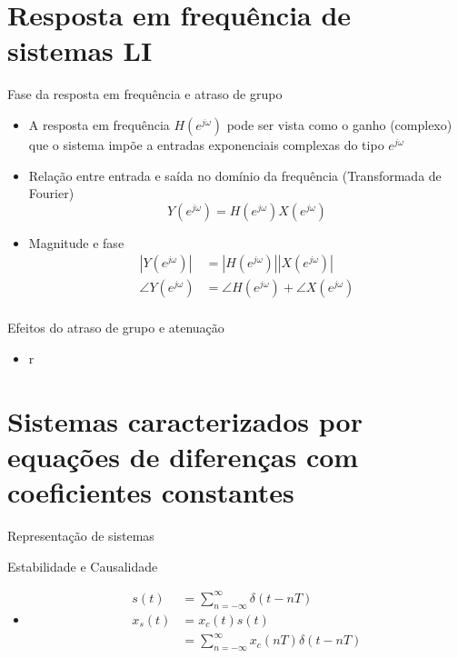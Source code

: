 \section{Resposta em frequência de sistemas LI}
\begin{slide}{Fase da resposta em frequência e atraso de grupo}
\begin{itemize}
	\item A resposta em frequência $H(e^{j\omega})$ pode ser vista como o ganho (complexo) que o sistema impõe a entradas exponenciais complexas do tipo $e^{j\omega}$
	\item Relação entre entrada e saída no domínio da frequência (Transformada de Fourier)
	   \begin{equation*}
		   Y(e^{j\omega}) = H(e^{j\omega})X(e^{j\omega})
	   \end{equation*}
        \item Magnitude e fase
	   \begin{align*}
		   |Y(e^{j\omega})| &= |H(e^{j\omega})| |X(e^{j\omega})|\\
		   \angle Y(e^{j\omega}) &= \angle H(e^{j\omega}) + \angle X(e^{j\omega})\\
	   \end{align*}
\end{itemize}
\end{slide}

\begin{slide}{Efeitos do atraso de grupo e atenuação}
\begin{itemize}
	\item r
\end{itemize}
\end{slide}

\section{Sistemas caracterizados por equações de diferenças com coeficientes constantes}
\begin{slide}{Representação de sistemas}
   \begin{figure} %
      \centering
   \end{figure}
\end{slide}

\begin{slide}{Estabilidade e Causalidade}
\begin{itemize}
   \item
   \begin{align}
      s(t) &= \sum_{n=-\infty}^{\infty}\delta(t-nT)\\
      x_s(t) &= x_c(t)s(t) \\ &= \sum_{n=-\infty}^{\infty}x_c(nT)\delta(t-nT)
   \end{align}
\end{itemize}
\end{slide}

